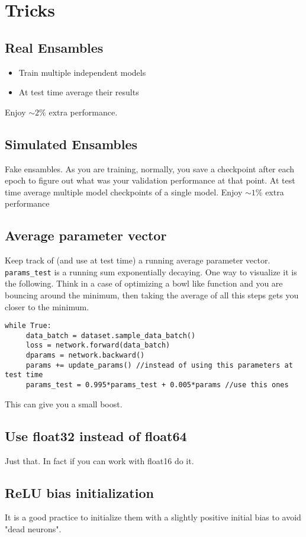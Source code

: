 \chapter{Tricks}


\section*{Real Ensambles}
\begin{itemize}
\item Train multiple independent models
\item At test time average their results
\end{itemize}

Enjoy $\sim 2$\% extra performance.

\section*{Simulated Ensambles}
Fake ensambles. As you are training, normally, you save a checkpoint after each epoch to figure out what was your validation performance at that point. At test time average multiple model checkpoints of a single model.
Enjoy $\sim 1$\% extra performance

\section*{Average parameter vector}
Keep track of (and use at test time) a running average parameter vector. \texttt{params\_test} is a running sum exponentially decaying. One way to visualize it is the following. Think in a case of optimizing a bowl like function and you are bouncing around the minimum, then taking the average of all this steps gets you closer to the minimum.

\begin{lstlisting}[frame=single]
while True:
     data_batch = dataset.sample_data_batch()
     loss = network.forward(data_batch)
     dparams = network.backward()
     params += update_params() //instead of using this parameters at test time
     params_test = 0.995*params_test + 0.005*params //use this ones
\end{lstlisting}

This can give you a small boost.

\section*{Use float32 instead of float64}

Just that. In fact if you can work with float16 do it.

\section*{ReLU bias initialization}
It is a good practice to initialize them with a slightly positive initial bias to avoid "dead neurons".

